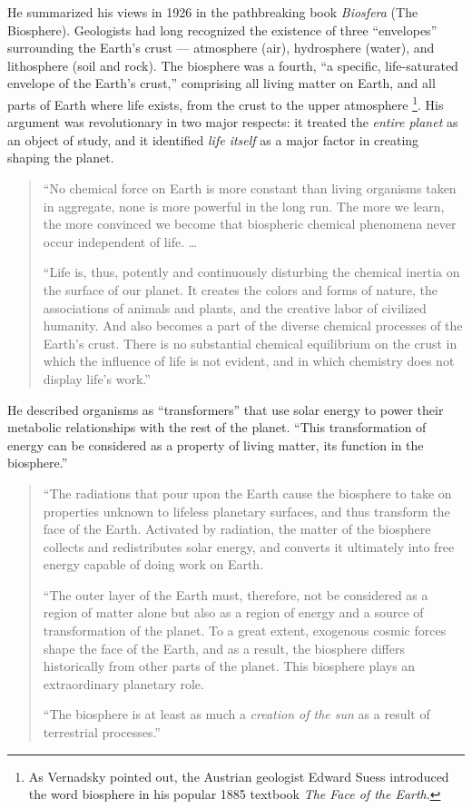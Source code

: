 \documentclass[11pt,a4paper]{article}
\begin{document}
He summarized his views in 1926 in the pathbreaking book \emph{Biosfera} (The
Biosphere). Geologists had long recognized the existence of three “envelopes”
surrounding the Earth’s crust — atmosphere (air), hydrosphere (water), and
lithosphere (soil and rock). The biosphere was a fourth, “a specific,
life-saturated envelope of the Earth’s crust,” comprising all living matter on
Earth, and all parts of Earth where life exists, from the crust to the upper
atmosphere \cite[p. 91]{6}\footnote{As Vernadsky pointed out, the Austrian
  geologist Edward Suess introduced the word biosphere in his popular 1885
  textbook \emph{The Face of the Earth}.}. His argument was revolutionary in
two major respects: it treated the \emph{entire planet} as an object of study,
and it identified \emph{life itself} as a major factor in creating shaping the
planet.
\begin{quote}
  “No chemical force on Earth is more constant than living organisms taken in
  aggregate, none is more powerful in the long run. The more we learn, the
  more convinced we become that biospheric chemical phenomena never occur
  independent of life.  …

  “Life is, thus, potently and continuously disturbing the chemical inertia on
  the surface of our planet. It creates the colors and forms of nature, the
  associations of animals and plants, and the creative labor of civilized
  humanity. And also becomes a part of the diverse chemical processes of the
  Earth’s crust. There is no substantial chemical equilibrium on the crust in
  which the influence of life is not evident, and in which chemistry does not
  display life’s work.” \cite[p. 56-58]{6}
\end{quote}
He described organisms as “transformers” that use solar energy to power their
metabolic relationships with the rest of the planet. “This transformation of
energy can be considered as a property of living matter, its function in the
biosphere.”
\begin{quote}
  “The radiations that pour upon the Earth cause the biosphere to take on
  properties unknown to lifeless planetary surfaces, and thus transform the
  face of the Earth. Activated by radiation, the matter of the biosphere
  collects and redistributes solar energy, and converts it ultimately into
  free energy capable of doing work on Earth.

  “The outer layer of the Earth must, therefore, not be considered as a region
  of matter alone but also as a region of energy and a source of
  transformation of the planet. To a great extent, exogenous cosmic forces
  shape the face of the Earth, and as a result, the biosphere differs
  historically from other parts of the planet. This biosphere plays an
  extraordinary planetary role.

  “The biosphere is at least as much a \emph{creation of the sun} as a result
  of terrestrial processes.” \cite[p. 59, 44]{6}
\end{quote}
\end{document}
